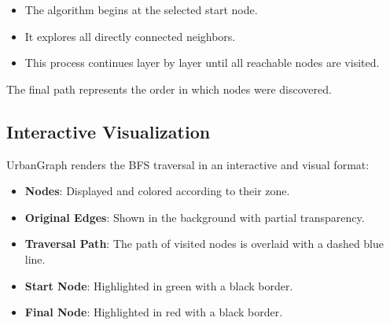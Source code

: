 \documentclass[12pt]{article}
\begin{document}
\begin{itemize}
    \item The algorithm begins at the selected start node.
    \item It explores all directly connected neighbors.
    \item This process continues layer by layer until all reachable nodes are visited.
\end{itemize}

The final path represents the order in which nodes were discovered.

\subsection*{Interactive Visualization}

UrbanGraph renders the BFS traversal in an interactive and visual format:
\begin{itemize}
    \item \textbf{Nodes}: Displayed and colored according to their zone.
    \item \textbf{Original Edges}: Shown in the background with partial transparency.
    \item \textbf{Traversal Path}: The path of visited nodes is overlaid with a dashed blue line.
    \item \textbf{Start Node}: Highlighted in green with a black border.
    \item \textbf{Final Node}: Highlighted in red with a black border.
\end{itemize}
\end{document}
